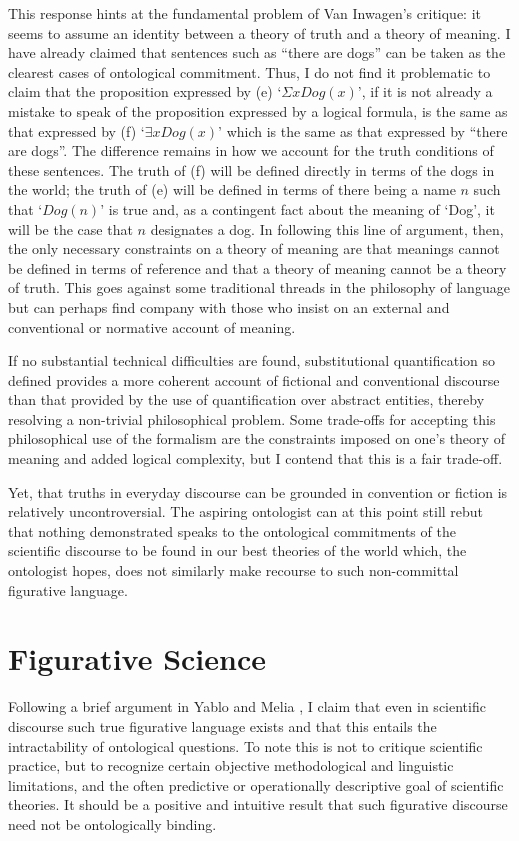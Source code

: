 \documentclass[12pt,a4paper]{article}
\begin{document}
This response hints at the fundamental problem of Van Inwagen's
critique: it seems to assume an identity between a theory of truth and
a theory of meaning. I have already claimed that sentences such as
``there are dogs'' can be taken as the clearest cases of ontological
commitment.  Thus, I do not find it problematic to claim that the
proposition expressed by (e) `$\Sigma xDog(x)$', if it is not already
a mistake to speak of the proposition expressed by a logical formula,
is the same as that expressed by (f) `$\exists xDog(x)$' which is the
same as that expressed by ``there are dogs''.  The difference remains
in how we account for the truth conditions of these sentences.  The
truth of (f) will be defined directly in terms of the dogs in the
world; the truth of (e) will be defined in terms of there being a name
$n$ such that `$Dog(n)$' is true and, as a contingent fact about the
meaning of `Dog', it will be the case that $n$ designates a dog.  In
following this line of argument, then, the only necessary constraints
on a theory of meaning are that meanings cannot be defined in terms of
reference and that a theory of meaning cannot be a theory of
truth. This goes against some traditional threads in the philosophy of
language but can perhaps find company with those who insist on an
external and conventional or normative account of meaning.

If no substantial technical difficulties are found, substitutional
quantification so defined provides a more coherent account of
fictional and conventional discourse than that provided by the use of
quantification over abstract entities, thereby resolving a non-trivial
philosophical problem. Some trade-offs for accepting this
philosophical use of the formalism are the constraints imposed on
one's theory of meaning and added logical complexity, but I contend
that this is a fair trade-off. 

Yet, that truths in everyday discourse can be grounded in convention
or fiction is relatively uncontroversial. The aspiring ontologist can
at this point still rebut that nothing demonstrated speaks to the
ontological commitments of the scientific discourse to be found in our
best theories of the world which, the ontologist hopes, does not
similarly make recourse to such non-committal figurative language.


\section{Figurative Science}
Following a brief argument in Yablo \cite{yablo} and Melia
\cite{melia}, I claim that even in scientific discourse such true
figurative language exists and that this entails the intractability of
ontological questions. To note this is not to critique scientific
practice, but to recognize certain objective methodological and
linguistic limitations, and the often predictive or operationally
descriptive goal of scientific theories. It should be a positive and
intuitive result that such figurative discourse need not be
ontologically binding.
\end{document}
